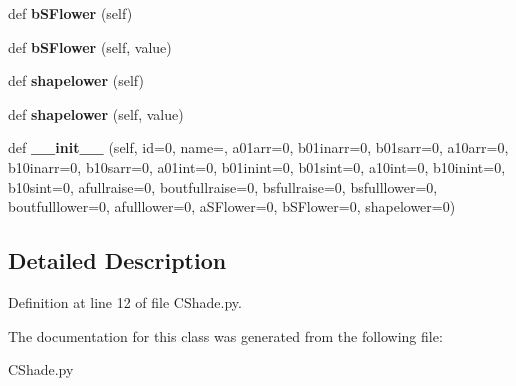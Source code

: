 \begin{DoxyCompactItemize}
\item 
\mbox{\label{class_c_shade_1_1_c_shade_a2f96183890fed63e015e5d7580ffa296}} 
def {\bfseries b\+S\+Flower} (self)
\item 
\mbox{\label{class_c_shade_1_1_c_shade_a77cde65eacdddc528337b7ed6586b2ef}} 
def {\bfseries b\+S\+Flower} (self, value)
\item 
\mbox{\label{class_c_shade_1_1_c_shade_a87593a9edc4c21f7b5acde8a0d339586}} 
def {\bfseries shapelower} (self)
\item 
\mbox{\label{class_c_shade_1_1_c_shade_ac8bf9586187ba8191a3c61593ed622f3}} 
def {\bfseries shapelower} (self, value)
\item 
\mbox{\label{class_c_shade_1_1_c_shade_aecfe92e74f185bbe044724fc20ff0e0e}} 
def {\bfseries \+\_\+\+\_\+init\+\_\+\+\_\+} (self, id=0, name=\textquotesingle{}\textquotesingle{}, a01arr=0, b01inarr=0, b01sarr=0, a10arr=0, b10inarr=0, b10sarr=0, a01int=0, b01inint=0, b01sint=0, a10int=0, b10inint=0, b10sint=0, afullraise=0, boutfullraise=0, bsfullraise=0, bsfulllower=0, boutfulllower=0, afulllower=0, a\+S\+Flower=0, b\+S\+Flower=0, shapelower=0)
\end{DoxyCompactItemize}


\subsection{Detailed Description}


Definition at line 12 of file C\+Shade.\+py.



The documentation for this class was generated from the following file\+:\begin{DoxyCompactItemize}
\item 
C\+Shade.\+py\end{DoxyCompactItemize}

